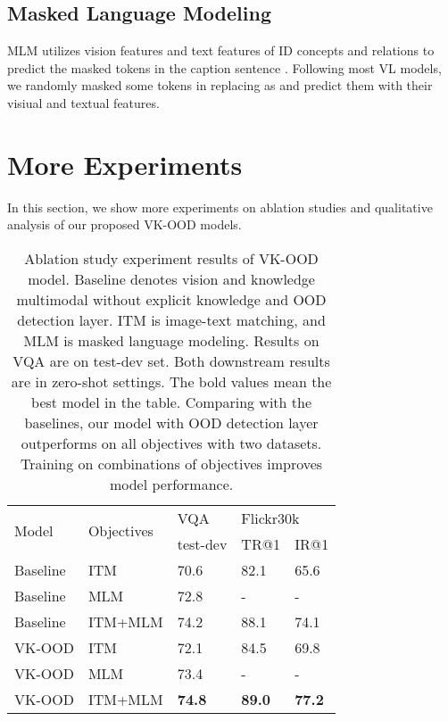 \documentclass{article}
\begin{document}
\subsection{Masked Language Modeling} 

MLM utilizes vision features and text features of ID concepts and relations to predict the masked tokens in the caption sentence . Following most VL models, we randomly masked some tokens in  replacing as  and predict them with their visiual and textual features. 


\section{More Experiments}
In this section, we show more experiments on ablation studies and qualitative analysis of our proposed VK-OOD models. 

\begin{table}[]
\caption{Ablation study experiment results of VK-OOD model. Baseline denotes vision and knowledge multimodal without explicit knowledge and OOD detection layer. ITM is image-text matching, and MLM is masked language modeling. Results on VQA are on test-dev set. Both downstream results are in zero-shot settings. The bold values mean the best model in the table. Comparing with the baselines, our model with OOD detection layer outperforms on all objectives with two datasets. Training on combinations of objectives improves model performance.}
\centering
\begin{tabular}{l|l|l|ll}
\hline
\multirow{2}{*}{Model} & \multirow{2}{*}{Objectives} & VQA           & \multicolumn{2}{l}{Flickr30k}                       \\ \cline{3-5} 
                       &                             & test-dev      & \multicolumn{1}{c}{TR@1} & \multicolumn{1}{c}{IR@1} \\ \hline
Baseline                    & ITM                         & 70.6          & 82.1                     & 65.6                     \\
Baseline                    & MLM                         & 72.8          & -                        & -                        \\
Baseline                    & ITM+MLM                     & 74.2          & 88.1                     & 74.1                     \\
VK-OOD                & ITM                         & 72.1          & 84.5                     & 69.8                     \\
VK-OOD                & MLM                         & 73.4          & -                        & -                        \\

VK-OOD                & ITM+MLM                     & \textbf{74.8} & \textbf{89.0}            & \textbf{77.2}            \\ \hline
\end{tabular}
\label{tab:abl}
\end{table}
\end{document}
